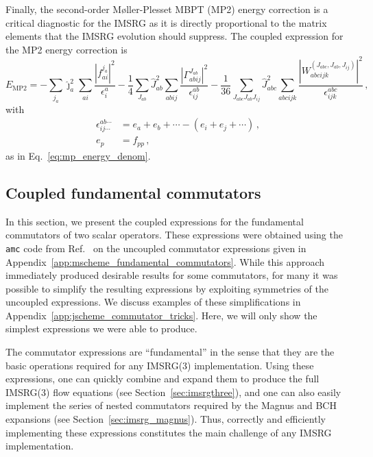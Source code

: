 Finally, the second-order M{\o}ller-Plesset MBPT (MP2) energy correction
is a critical diagnostic for the IMSRG
as it is directly proportional to the matrix elements
that the IMSRG evolution should suppress.
The coupled expression for the MP2 energy correction is
\begin{equation}
  E_{\text{MP2}} =
  - \sum_{j_{a}} \hat{\jmath}_{a}^2 \sum_{ai} \frac{|f_{ai}^{j_a}|^2}{\epsilon_{i}^{a}}
  - \frac{1}{4} \sum_{J_{ab}} \hat{J}_{ab}^2 \sum_{abij}
  \frac{|\Gamma_{abij}^{J_{ab}}|^2}{\epsilon_{ij}^{ab}}
  - \frac{1}{36} \sum_{J_{abc} J_{ab} J_{ij}} \hat{J}_{abc}^2 \sum_{abcijk}
  \frac{|W_{abcijk}^{(J_{abc}, J_{ab}, J_{ij})}|^2}{\epsilon_{ijk}^{abc}}\,,
\end{equation}
with
\begin{align}
  \epsilon_{ij\cdots}^{ab\cdots} & = e_a + e_b + \cdots - (e_i + e_j + \cdots)\,, \\
  e_p                            & = f_{pp}\,,
\end{align}
as in Eq.~\eqref{eq:mp_energy_denom}.

\subsection{Coupled fundamental commutators}\label{sec:jscheme_fundamental_comm}

In this section,
we present the coupled expressions for
the fundamental commutators of two scalar operators.
These expressions were obtained using
the \texttt{amc} code from Ref.~\cite{Tich20jcoupling}
on the uncoupled commutator expressions
given in Appendix~\ref{app:mscheme_fundamental_commutators}.
While this approach immediately produced desirable results
for some commutators,
for many it was possible to simplify the resulting expressions
by exploiting symmetries of the uncoupled expressions.
We discuss examples of these simplifications in Appendix~\ref{app:jscheme_commutator_tricks}.
Here, we will only show the simplest expressions
we were able to produce.

The commutator expressions are ``fundamental'' in the sense
that they are the basic operations required for any IMSRG(3) implementation.
Using these expressions,
one can quickly combine and expand them to produce
the full IMSRG(3) flow equations (see Section~\ref{sec:imsrgthree}),
and one can also easily implement
the series of nested commutators required by
the Magnus and BCH expansions (see Section~\ref{sec:imsrg_magnus}).
Thus, correctly and efficiently implementing these expressions
constitutes the main challenge of any IMSRG implementation.

